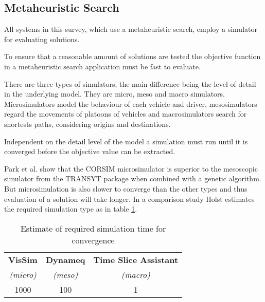 \label{adaptive_cooperation}

\subsection{Metaheuristic Search}
All systems in this survey, which use a metaheuristic search, employ a simulator for evaluating solutions.

To ensure that a reasonable amount of solutions are tested the objective function in a metaheuristic search application must be fast to evaluate. 

There are three types of simulators, the main difference being the level of detail in the underlying model. They are micro, meso and macro simulators. Microsimulators model the behaviour of each vehicle and driver, mesosimulators regard the movements of platoons of vehicles and macrosimulators search for shortests paths, considering origins and destinations.

Independent on the detail level of the model a simulation must run until it is converged before the objective value can be extracted. 

Park et al. \cite{4} show that the CORSIM microsimulator is superior to the mesoscopic simulator from the TRANSYT package when combined with a genetic algorithm. But microsimulation is also slower to converge than the other types and thus evaluation of a solution will take longer. In a comparison study \cite{simcompare} Holst estimates the required simulation type as in table \ref{tab:convergespeed}.

\begin{table}[!h]
\begin{center}
\begin{tabular}{c|c|c}
\textbf{VisSim} & \textbf{Dynameq} & \textbf{Time Slice Assistant} \\
\textit{(micro)} & \textit{(meso)} & \textit{(macro)} \\ \hline
1000 & 100 & 1
\end{tabular}
\end{center}
\label{tab:convergespeed}
\caption{Estimate of required simulation time for convergence}
\end{table}